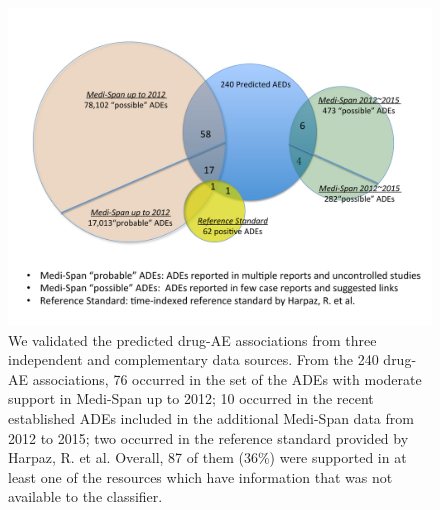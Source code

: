 \begin{figure}
  \begin{center}
    \includegraphics[width=0.9\linewidth]{ch3-figures/Figure4.pdf}
  \end{center}
  \caption[Validation of predicted ADEs]{We validated the predicted
    drug-AE associations from three independent and complementary data
    sources. From the 240 drug-AE associations, 76 occurred in the set
    of the ADEs with moderate support in Medi-Span up to 2012; 10
    occurred in the recent established ADEs included in the additional
    Medi-Span data from 2012 to 2015; two occurred in the reference
    standard provided by Harpaz, R. et al. Overall, 87 of them (36\%)
    were supported in at least one of the resources which have
    information that was not available to the classifier.  }
  \label{fig:short}
\end{figure}


